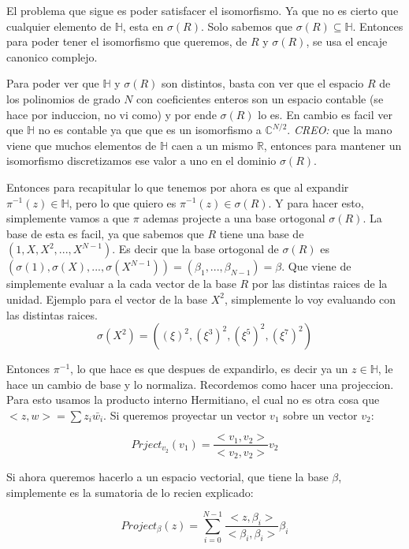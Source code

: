 \documentclass[12pt, oneside]{article}
\begin{document}
El problema que sigue es poder satisfacer el isomorfismo.
Ya que no es cierto que cualquier elemento de $\mathbb{H}$,
esta en $\sigma(R)$.
Solo sabemos que $\sigma(R)\subseteq \mathbb{H}$.
Entonces para poder tener el isomorfismo que queremos, de $R$ y $\sigma(R)$,
se usa el encaje canonico complejo.

Para poder ver que $\mathbb{H}$ y $\sigma(R)$ son distintos, basta con ver que
el espacio $R$ de los polinomios de grado $N$ con coeficientes enteros son un espacio
contable (se hace por induccion, no vi como) y por ende $\sigma(R)$ lo es.
En cambio es facil ver que $\mathbb{H}$ no es contable ya que que es un isomorfismo
a $\mathbb{C}^{N/2}$.
\textit{CREO:} que la mano viene que muchos elementos de $\mathbb{H}$ caen a un mismo $\mathbb{R}$,
entonces para mantener un isomorfismo discretizamos ese valor a uno en el dominio $\sigma(R)$.

Entonces para recapitular lo que tenemos por ahora es que al expandir $\pi^{-1}(z)\in\mathbb{H}$,
pero lo que quiero es $\pi^{-1}(z)\in\sigma(R)$.
Y para hacer esto, simplemente vamos a que $\pi$ ademas projecte a una base ortogonal  $\sigma(R)$.
La base de esta es facil, ya que sabemos que $R$ tiene una base de $(1, X, X^2, ..., X^{N-1})$.
Es decir que la base ortogonal de  $\sigma(R)$ es $(\sigma(1), \sigma(X),..., \sigma(X^{N-1}))=(\beta_1,...,\beta_{N-1})=\beta$.
Que viene de simplemente evaluar a la cada vector de la base $R$ por las distintas raices de la unidad.
Ejemplo para el vector de la base $X^2$, simplemente lo voy evaluando con las distintas raices.
\begin{equation*}
    \sigma(X^2) = ((\xi)^2, (\xi^3)^2, (\xi^5)^2,(\xi^7)^2)
\end{equation*}


Entonces $\pi^{-1}$, lo que hace es que despues de expandirlo, es decir ya un $z\in\mathbb{H}$,
le hace un cambio de base y lo normaliza.
Recordemos como hacer una projeccion.
Para esto usamos la producto interno Hermitiano, el cual no es otra cosa que $<z,w>=\sum z_i\bar{w_i}$.
Si queremos proyectar un vector $v_1$ sobre un vector $v_2$:


\begin{equation*}
    Prject_{v_2}(v_1) = \frac{<v_1,v_2>}{<v_2,v_2>}v_2
    \label{eq:project}
\end{equation*}

Si ahora queremos hacerlo a un espacio vectorial, que tiene la base $\beta$, simplemente
es la sumatoria de lo recien explicado:

\begin{equation*}
    Project_{\beta}(z) = \sum_{i=0}^{N-1}\frac{<z,\beta_i>}{<\beta_i,\beta_i>}\beta_i
    \label{eq:project}
\end{equation*}
\end{document}
